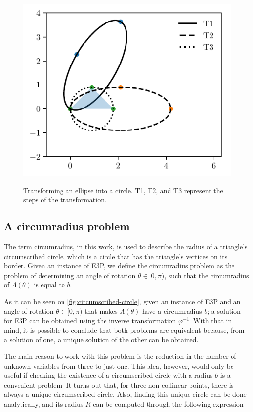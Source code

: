 \begin{figure}
	\centering
	\caption{Transforming an ellipse into a circle. T1, T2, and T3 represent the steps of the transformation.}
	\includegraphics{tex/figures/scripts/circumscribed-circle}
	\fautor
	\label{fig:circumscribed-circle}
\end{figure}

\subsection{A circumradius problem}

The term circumradius, in this work, is used to describe the radius of a triangle's circumscribed circle, which is a circle that has the triangle's vertices on its border. Given an instance of E3P, we define the circumradius problem as the problem of determining an angle of rotation $\theta\in[0, \pi)$, such that the circumradius of $\Lambda(\theta)$ is equal to $b$.

As it can be seen on \autoref{fig:circumscribed-circle}, given an instance of E3P and an angle of rotation $\theta\in[0, \pi)$ that makes $\Lambda(\theta)$ have a circumradius $b$; a solution for E3P can be obtained using the inverse transformation $\varphi^{-1}$. 
With that in mind, it is possible to conclude that both problems are equivalent because, from a solution of one, a unique solution of the other can be obtained.

The main reason to work with this problem is the reduction in the number of unknown variables from three to just one. This idea, however, would only be useful if checking the existence of a circumscribed circle with a radius $b$ is a convenient problem.
It turns out that, for three non-collinear points, there is always a unique circumscribed circle. Also, finding this unique circle can be done analytically, and its radius $R$ can be computed through the following expression

